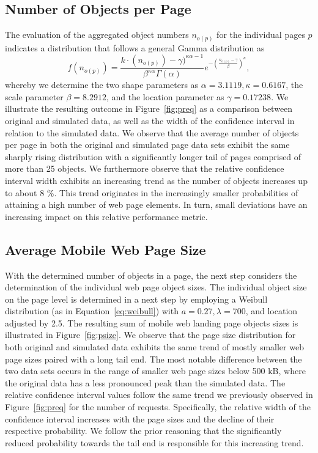 \documentclass[letterpaper,conference]{IEEEtran}
\begin{document}
\subsection{Number of Objects per Page}
The evaluation of the aggregated object numbers $n_{o(p)}$ for the individual pages $p$ indicates a distribution that follows a general Gamma distribution as 
\begin{equation*}\label{eq:gg}
f\left( n_{o(p)} \right) = \frac{ k \cdot (n_{o(p)})-\gamma)^{\kappa\alpha-1} }{\beta^{\kappa\alpha}\Gamma(\alpha)}e^{-\left(\frac{n_{o(p)}-\gamma}{\beta}\right)^\kappa},
\end{equation*}
whereby we determine the two shape parameters as $\alpha=3.1119, \kappa=0.6167$, the scale parameter $\beta=8.2912$, and the location parameter as $\gamma=0.17238$.
%
We illustrate the resulting outcome in Figure~\ref{fig:preq} as a comparison between original and simulated data, as well as the  width of the confidence interval in relation to the simulated data.
We observe that the average number of objects per page in both the original and simulated page data sets exhibit the same sharply rising distribution with a significantly longer tail of pages comprised of more than 25 objects.
We furthermore observe that the relative confidence interval width exhibits an increasing trend as the number of objects increases up to about 8 \%. 
This trend originates in the increasingly smaller probabilities of attaining a high number of web page elements. In turn, small deviations have an increasing impact on this relative performance metric. 



\subsection{Average Mobile Web Page Size}
With the determined number of objects in a page, the next step considers the determination of the individual web page object sizes.
The individual object size on the page level is determined in a next step by employing a Weibull distribution (as in Equation~\ref{eq:weibull}) with $a=0.27 ,\lambda=700$, and location adjusted by 2.5.
The resulting sum of mobile web landing page objects sizes is illustrated in Figure~\ref{fig:psize}.
We observe that the page size distribution for both original and simulated data  exhibits the same trend of mostly smaller web page sizes paired with a long tail end.
The most notable difference between the two data sets occurs in the range of smaller web page sizes below 500 kB, where the original data has a less pronounced peak than the simulated data.
The relative confidence interval values follow the same trend we previously observed in Figure~\ref{fig:preq} for the number of requests.
Specifically, the relative width of the confidence interval increases with the page sizes and the decline of their respective probability.
We follow the prior reasoning that the significantly reduced probability towards the tail end is responsible for this increasing trend.  
\end{document}
